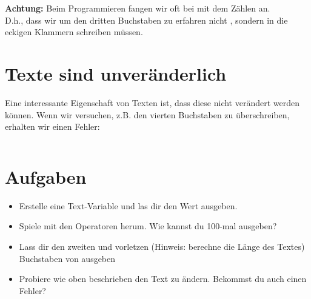\documentclass{\VorlagenPfad/coderdojokatext}
\begin{document}
\begin{merkbox}
	\textbf{Achtung:} Beim Programmieren fangen wir oft bei  mit dem Zählen an.\\
	D.h., dass wir um den dritten Buchstaben zu erfahren nicht , sondern  in die eckigen Klammern schreiben müssen.
\end{merkbox}

\section{Texte sind unveränderlich}
Eine interessante Eigenschaft von Texten ist, dass diese nicht verändert werden können. 
Wenn wir versuchen, z.B. den vierten Buchstaben zu überschreiben, erhalten wir einen Fehler:

\inputminted[firstline=22, lastline=23]{python}{../../../Beispiele/text.py}

\section{Aufgaben}
\begin{itemize}
	\item Erstelle eine Text-Variable und las dir den Wert ausgeben.
	\item Spiele mit den Operatoren herum. Wie kannst du 100-mal  ausgeben?
	\item Lass dir den zweiten und vorletzen (Hinweis: berechne die Länge des Textes) Buchstaben von   ausgeben
	\item Probiere wie oben beschrieben den Text zu ändern. Bekommst du auch einen Fehler?
\end{itemize}
\end{document}
